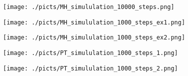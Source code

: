 \begin{frame}[plain]

	\begin{center}
		\begin{figure}\texttt{[image: ./picts/MH\_simululation\_10000\_steps.png]}\end{figure}	
	\end{center}	
		
\end{frame}

\begin{frame}[plain]

	\begin{center}
		\begin{figure}\texttt{[image: ./picts/MH\_simululation\_1000\_steps\_ex1.png]}\end{figure}	
	\end{center}	
		
\end{frame}

\begin{frame}[plain]

	\begin{center}
		\begin{figure}\texttt{[image: ./picts/MH\_simululation\_1000\_steps\_ex2.png]}\end{figure}	
	\end{center}	
		
\end{frame}



\begin{frame}[plain]

	\begin{center}
		\begin{figure}\texttt{[image: ./picts/PT\_simululation\_1000\_steps\_1.png]}\end{figure}	
	\end{center}	
		
\end{frame}

\begin{frame}[plain]

	\begin{center}
		\begin{figure}\texttt{[image: ./picts/PT\_simululation\_1000\_steps\_2.png]}\end{figure}	
	\end{center}	
		
\end{frame}

